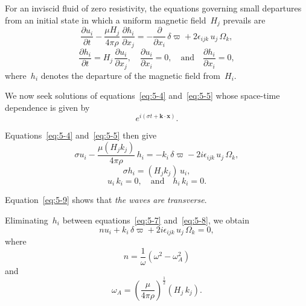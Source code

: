 For an inviscid fluid of zero resistivity, the equations governing small
departures from an initial state in which a uniform magnetic field~$H_j$
prevails are
\begin{equation}
  \frac{\partial u_i}{\partial t}
  - \frac{\mu H_j}{4\pi\rho}\,\frac{\partial h_i}{\partial x_j}
  = -\frac{\partial}{\partial x_i}\,\delta\varpi
    + 2\epsilon_{ijk}\,u_j\,\Omega_k,
  \label{eq:5-4}
\end{equation}
\begin{equation}
  \frac{\partial h_i}{\partial t}
  = H_j\,\frac{\partial u_i}{\partial x_j},
  \quad
  \frac{\partial u_i}{\partial x_i} = 0,
  \quad\text{and}\quad
  \frac{\partial h_i}{\partial x_i} = 0,
  \label{eq:5-5}
\end{equation}
where~$h_i$ denotes the departure of the magnetic field from~$H_i$.

We now seek solutions of equations~\eqref{eq:5-4} and~\eqref{eq:5-5}
whose space-time dependence is given by
\begin{equation}
  e^{i(\sigma t + \mathbf{k}\cdot\mathbf{x})}.
  \label{eq:5-6}
\end{equation}

Equations~\eqref{eq:5-4} and~\eqref{eq:5-5} then give
\begin{equation}
  \sigma u_i
  - \frac{\mu(H_j k_j)}{4\pi\rho}\,h_i
  = -k_i\,\delta\varpi - 2i\epsilon_{ijk}\,u_j\,\Omega_k,
  \label{eq:5-7}
\end{equation}
\begin{equation}
  \sigma h_i = (H_j k_j)\,u_i,
  \label{eq:5-8}
\end{equation}
\begin{equation}
  u_i\,k_i = 0,
  \quad\text{and}\quad
  h_i\,k_i = 0.
  \label{eq:5-9}
\end{equation}

Equation~\eqref{eq:5-9} shows that \emph{the waves are transverse}.

Eliminating~$h_i$ between equations~\eqref{eq:5-7} and~\eqref{eq:5-8},
we obtain
\begin{equation}
  n u_i + k_i\,\delta\varpi + 2i\epsilon_{ijk}\,u_j\,\Omega_k = 0,
  \label{eq:5-10}
\end{equation}
where
\begin{equation}
  n = \frac{1}{\omega}(\omega^{2}-\omega_{A}^{2})
  \label{eq:5-11}
\end{equation}
and
\begin{equation}
  \omega_{A} = \left(\frac{\mu}{4\pi\rho}\right)^{\!\frac{1}{2}}
  (H_{j}\,k_{j}).
  \label{eq:5-12}
\end{equation}

